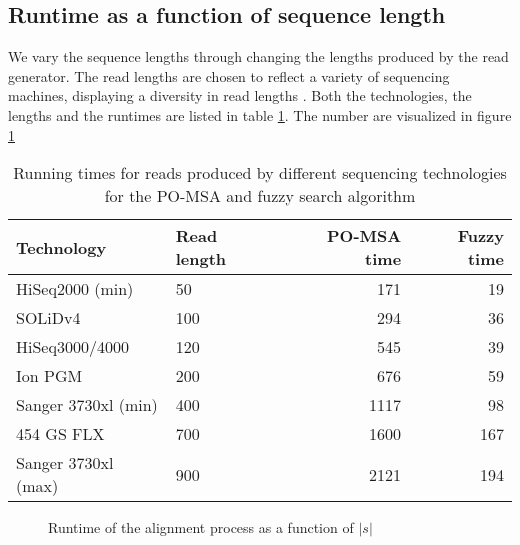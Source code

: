 \documentclass[thesis.tex]{subfiles}
\begin{document}
\subsection*{Runtime as a function of sequence length}
We vary the sequence lengths through changing the lengths produced by the read generator. The read lengths are chosen to reflect a variety of sequencing machines, displaying a diversity in read lengths \cite{sequencing_platforms}\cite{comparison_sequencing_systems}. Both the technologies, the lengths and the runtimes are listed in table \ref{tab:runtimes_s}. The number are visualized in figure \ref{fig:runtime_s}
\begin{table}[!h]
  \begin{tabular}{|l|l|r|r|}
    \hline \textbf{Technology} & \textbf{Read length} & \textbf{PO-MSA time} & \textbf{Fuzzy time} \\ \hline
    HiSeq2000 (min) & 50 & 171 & 19 \\ \hline
    SOLiDv4 & 100 & 294 & 36 \\ \hline
    HiSeq3000/4000 & 120 & 545 & 39 \\ \hline
    Ion PGM & 200 & 676 & 59 \\ \hline
    Sanger 3730xl (min) & 400 & 1117 & 98 \\ \hline
    454 GS FLX & 700 & 1600 & 167 \\ \hline
    Sanger 3730xl (max) & 900 & 2121 & 194 \\ \hline
  \end{tabular}
  \caption{Running times for reads produced by different sequencing technologies for the PO-MSA and fuzzy search algorithm}
  \label{tab:runtimes_s}
\end{table}
\begin{figure}[!hb]
  \caption{Runtime of the alignment process as a function of $|s|$}
  \label{fig:runtime_s}
\end{figure}
\clearpage
\end{document}
